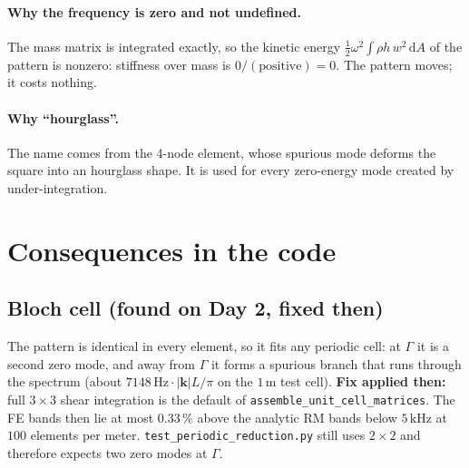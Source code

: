 \documentclass[11pt]{article}
\begin{document}
\paragraph{Why the frequency is zero and not undefined.} The mass matrix is integrated
exactly, so the kinetic energy $\frac12\omega^2 \int \rho h\, w^2\,\mathrm{d}A$ of the
pattern is nonzero: stiffness over mass is $0/(\text{positive}) = 0$. The pattern
moves; it costs nothing.

\paragraph{Why ``hourglass''.} The name comes from the 4-node element, whose spurious
mode deforms the square into an hourglass shape. It is used for every
zero-energy mode created by under-integration.

\section{Consequences in the code}

\subsection{Bloch cell (found on Day 2, fixed then)}
The pattern is identical in every element, so it fits any periodic cell: at $\Gamma$
it is a second zero mode, and away from $\Gamma$ it forms a spurious branch that runs
through the spectrum (about $7148\,\mathrm{Hz}\cdot|\mathbf{k}|L/\pi$ on the
$1\,\mathrm{m}$ test cell). \textbf{Fix applied then:} full $3\times 3$ shear
integration is the default of \texttt{assemble\_unit\_cell\_matrices}. The FE bands
then lie at most $0.33\,\%$ above the analytic RM bands below $5\,\mathrm{kHz}$ at
$100$ elements per meter. \texttt{test\_periodic\_reduction.py} still uses $2\times 2$
and therefore expects two zero modes at $\Gamma$.
\end{document}
